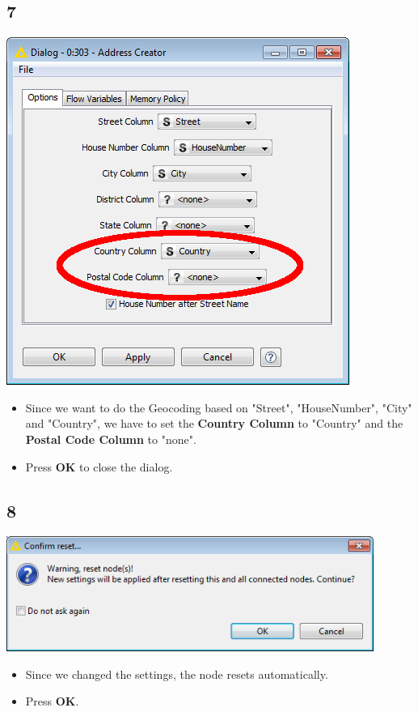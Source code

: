 \documentclass{beamer}
\begin{document}
\subsection{7}
\begin{frame}
	\begin{center}
  		\includegraphics[height=0.6\textheight]{7.png}
	\end{center}
	\begin{itemize}
		\item Since we want to do the Geocoding based on "Street", "HouseNumber", "City" and "Country", we have to set the \textbf{Country Column} to "Country" and the \textbf{Postal Code Column} to "none".
		\item Press \textbf{OK} to close the dialog.
	\end{itemize}
\end{frame}

\subsection{8}
\begin{frame}
	\begin{center}
  		\includegraphics[width=0.9\textwidth]{8.png}
	\end{center}
	\begin{itemize}
		\item Since we changed the settings, the node resets automatically.
		\item Press \textbf{OK}.
	\end{itemize}
\end{frame}
\end{document}
